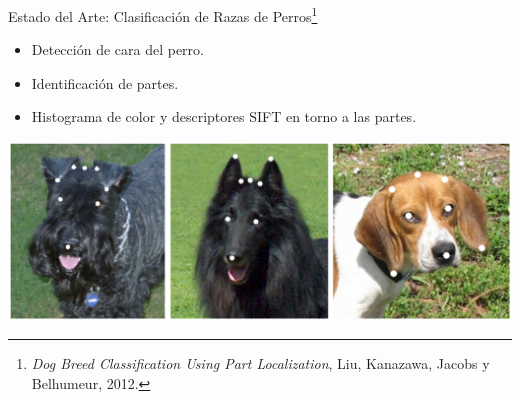 \documentclass{beamer}
\begin{document}
\begin{frame}{Estado del Arte: Clasificación de Razas de
        Perros\footnote{\emph{Dog Breed Classification Using Part
    Localization}, Liu, Kanazawa, Jacobs y Belhumeur, 2012. }}
    \begin{itemize}
            \pause
        \item Detección de cara del perro.
            \pause
        \item Identificación de partes.
            \pause
        \item Histograma de color y descriptores SIFT en torno a las partes.
            \pause
    \end{itemize}
    \begin{center}
        \includegraphics[scale=0.15]{imagen/dogannotation}
    \end{center}
\end{frame}
\end{document}
